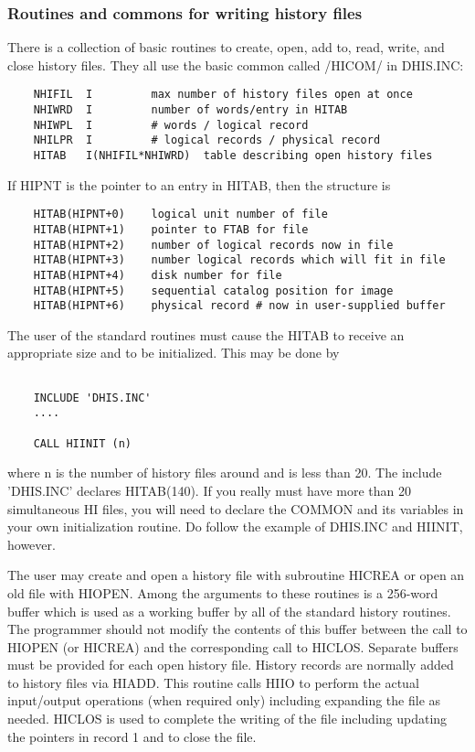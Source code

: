 \subsubsection{Routines and commons for writing history files}


      There is a collection of basic routines to create, open, add to,
read, write, and close history files.  They all use the basic common
called /HICOM/ in DHIS.INC:

\begin{verbatim}
    NHIFIL  I         max number of history files open at once
    NHIWRD  I         number of words/entry in HITAB
    NHIWPL  I         # words / logical record
    NHILPR  I         # logical records / physical record
    HITAB   I(NHIFIL*NHIWRD)  table describing open history files
\end{verbatim}

If HIPNT is the pointer to an entry in HITAB, then the structure is

\begin{verbatim}
    HITAB(HIPNT+0)    logical unit number of file
    HITAB(HIPNT+1)    pointer to FTAB for file
    HITAB(HIPNT+2)    number of logical records now in file
    HITAB(HIPNT+3)    number logical records which will fit in file
    HITAB(HIPNT+4)    disk number for file
    HITAB(HIPNT+5)    sequential catalog position for image
    HITAB(HIPNT+6)    physical record # now in user-supplied buffer
\end{verbatim}

The user of the standard routines must cause the HITAB to receive an
appropriate size and to be initialized.  This may be done by

\begin{verbatim}

    INCLUDE 'DHIS.INC'
    ....

    CALL HIINIT (n)
\end{verbatim}
where n is the number of history files around and is less than 20.
The include 'DHIS.INC' declares HITAB(140).  If you really must
have more than 20 simultaneous HI files, you will need to declare
the COMMON and its variables in your own initialization routine.
Do follow the example of DHIS.INC and HIINIT, however.

      The user may create and open a history file with subroutine
HICREA or open an old file with HIOPEN.
Among the arguments to these routines is a 256-word buffer which is
used as a working buffer by all of the standard history routines.  The
programmer should not modify the contents of this buffer between the
call to HIOPEN (or HICREA) and the corresponding call to
HICLOS.  Separate buffers must be provided for each open
history file.  History records are normally added to history files via
HIADD.  This routine calls HIIO to perform
the actual input/output operations (when required only) including
expanding the file as needed.  HICLOS is used to complete the writing
of the file including updating the pointers in record 1 and to close
the file.


